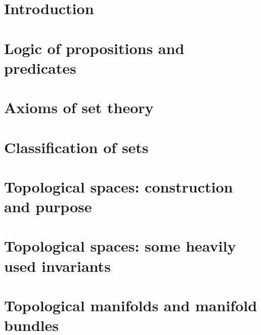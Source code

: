 \documentclass[
11pt, %
a4paper, %
oneside, %
headinclude,footinclude, %
]{scrartcl}
\begin{document}


\newpage %


\section*{Introduction}

\newpage

\section{Logic of propositions and predicates}

\newpage

\section{Axioms of set theory}

\newpage

\section{Classification of sets}

\newpage

\section{Topological spaces: construction and purpose}

\newpage

\section{Topological spaces: some heavily used invariants}


\section{Topological manifolds and manifold bundles}
\end{document}
